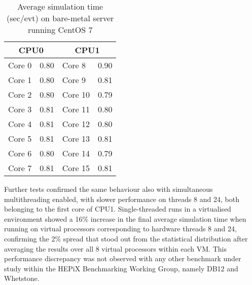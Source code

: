 \documentclass[a4paper]{jpconf}
\begin{document}

\begin{wraptable}{l}{0.35\linewidth}
    \vspace{-3mm}
    \caption{Average simulation time \newline (sec/evt) on bare-metal server \newline 
             running CentOS 7}
    \label{table:simulation-time-cores}
    \begin{tabular}{ |l |  l  || l | l|}
        \hline
        \multicolumn{2}{|c||}{CPU0} & \multicolumn{2}{|c|}{CPU1} \\
        \hline
         Core 0  & 0.80 & Core 8  & 0.90\\
        \hline
         Core 1  & 0.80 & Core 9  & 0.81\\
        \hline
         Core 2  & 0.80 & Core 10  & 0.79\\
        \hline
         Core 3  & 0.81 & Core 11  & 0.80\\
        \hline
         Core 4  & 0.81 & Core 12  & 0.80\\
        \hline
         Core 5  & 0.81 & Core 13  & 0.81\\
        \hline
         Core 6  & 0.80 & Core 14 & 0.79\\
        \hline
        Core 7  & 0.81 & Core 15  & 0.81\\
        \hline
    \end{tabular}
    \vspace{-7mm}
\end{wraptable}
Further tests confirmed the same behaviour also with simultaneous multithreading
enabled, with slower performance on threads 8 and 24, both belonging to the first core of
CPU1. Single-threaded runs in a virtualised environment showed a 16\%
increase in the final average simulation time when running on virtual processors
corresponding to hardware threads 8 and 24, confirming the 2\%
spread that stood out from the statistical distribution after averaging the results
over all 8 virtual processors within each VM. This performance discrepancy
was not observed with any other benchmark under study within the HEPiX Benchmarking
Working Group, namely DB12 and Whetstone.
\end{document}
